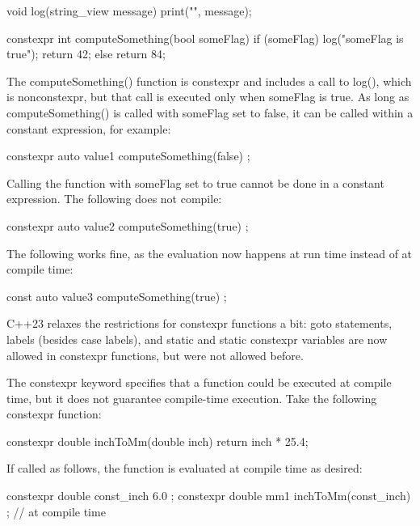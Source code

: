 \begin{cpp}
void log(string_view message) { print("{}", message); }

constexpr int computeSomething(bool someFlag)
{
    if (someFlag) {
        log("someFlag is true");
        return 42;
    }
    else { return 84; }
}
\end{cpp}

The computeSomething() function is constexpr and includes a call to log(), which is nonconstexpr, but that call is executed only when someFlag is true. As long as computeSomething() is called with someFlag set to false, it can be called within a constant expression, for example:

\begin{cpp}
constexpr auto value1 { computeSomething(false) };
\end{cpp}

Calling the function with someFlag set to true cannot be done in a constant expression. The following does not compile:

\begin{cpp}
constexpr auto value2 { computeSomething(true) };
\end{cpp}

The following works fine, as the evaluation now happens at run time instead of at compile time:

\begin{cpp}
const auto value3 { computeSomething(true) };
\end{cpp}


C++23 relaxes the restrictions for constexpr functions a bit: goto statements, labels (besides case labels), and static and static constexpr variables are now allowed in constexpr functions, but were not allowed before.


The constexpr keyword specifies that a function could be executed at compile time, but it does not guarantee compile-time execution. Take the following constexpr function:

\begin{cpp}
constexpr double inchToMm(double inch) { return inch * 25.4; }
\end{cpp}

If called as follows, the function is evaluated at compile time as desired:

\begin{cpp}
constexpr double const_inch { 6.0 };
constexpr double mm1 { inchToMm(const_inch) }; // at compile time
\end{cpp}

